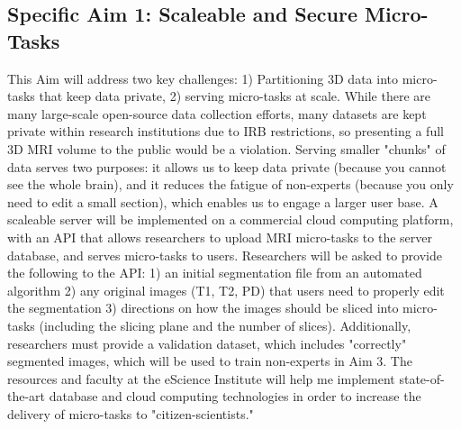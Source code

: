 \subsection*{Specific Aim 1: Scaleable and Secure Micro-Tasks}

This Aim will address two key challenges: 1) Partitioning 3D data into micro-tasks that keep data private, 2) serving micro-tasks at scale. While there are many large-scale open-source data collection efforts, many datasets are kept private within research institutions due to  IRB restrictions, so presenting a full 3D MRI volume to the public would be a violation. Serving smaller "chunks" of data serves two purposes: it allows us to keep data private (because you cannot see the whole brain), and it reduces the fatigue of non-experts (because you only need to edit a small section), which enables us to engage a larger user base. A scaleable server will be implemented on a commercial cloud computing platform, with an API that allows researchers to upload MRI micro-tasks to the server database, and serves micro-tasks to users. Researchers will be asked to provide the following to the API: 1) an initial segmentation file from an automated algorithm 2) any original images (T1, T2, PD) that users need to properly edit the segmentation 3) directions on how the images should be sliced into micro-tasks (including the slicing plane and the number of slices). Additionally, researchers must provide a validation dataset, which includes "correctly" segmented images, which will be used to train non-experts in Aim 3. The resources and faculty at the eScience Institute will help me implement state-of-the-art database and cloud computing technologies in order to increase the delivery of micro-tasks to "citizen-scientists."